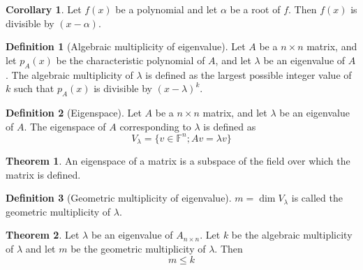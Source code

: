 \documentclass[fleqn, a4paper, 12pt, draft]{article}
\theoremstyle{definition}
\newtheorem{definition}{Definition} %
\theoremstyle{theorem}
\newtheorem{theorem}{Theorem} %
\newtheorem{corollary}{Corollary}
\theoremstyle{remark}
\numberwithin{corollary}{theorem}
\numberwithin{equation}{theorem}
\begin{document}
\begin{corollary}
	Let $f(x)$ be a polynomial and let $\alpha$ be a root of $f$. Then $f(x)$ is divisible by $(x - \alpha)$.
\end{corollary}

\begin{definition}[Algebraic multiplicity of eigenvalue]\label{algebraic multiplicity}
	Let $A$ be a $n \times n$ matrix, and let $p_A (x)$ be the characteristic polynomial of $A$, and let $\lambda$ be an eigenvalue of $A$. The algebraic multiplicity of $\lambda$ is defined as the largest possible integer value of $k$ such that $p_A(x)$ is divisible by $(x - \lambda)^k$.
\end{definition}

\begin{definition}[Eigenspace]
	Let $A$ be a $n \times n$ matrix, and let $\lambda$ be an eigenvalue of $A$. The eigenspace of $A$ corresponding to $\lambda$ is defined as
	\begin{equation*}
		V_{\lambda} = \{v \in \mathbb{F}^n ; A v = \lambda v \}
	\end{equation*} 
\end{definition}

\begin{theorem}
	An eigenspace of a matrix is a subspace of the field over which the matrix is defined.
\end{theorem}

\begin{definition}[Geometric multiplicity of eigenvalue]
	$m = \dim V_{\lambda}$ is called the geometric multiplicity of $\lambda$.
\end{definition}

\begin{theorem}
	Let $\lambda$ be an eigenvalue of $A_{n \times n}$. Let $k$ be the algebraic multiplicity of $\lambda$ and let $m$ be the geometric multiplicity of $\lambda$. Then
	\begin{equation*}
		m \leq k
	\end{equation*}
\end{theorem}
\end{document}
